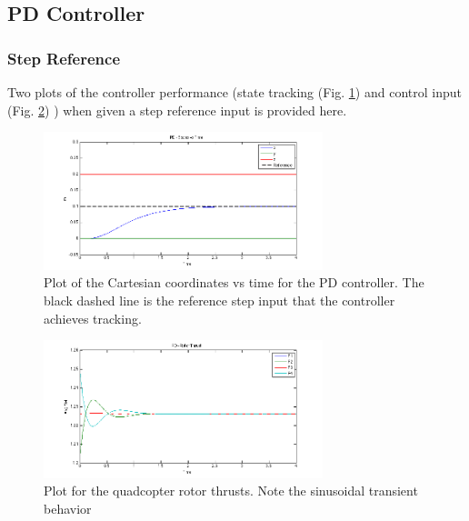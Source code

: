 \documentclass[conference]{IEEEtran}
\begin{document}
\subsection{PD Controller}
\subsubsection{Step Reference}
Two plots of the controller performance (state tracking (Fig. \ref{fig:pd_1}) and control input (Fig. \ref{fig:pd_2}) ) when given a step reference input is provided here.
\begin{figure}[!ht]
\centering
\includegraphics[width=3.2in]{../pd_1.png}
\caption{Plot of the Cartesian coordinates vs time for the PD controller. The black dashed line is the reference step input that the controller achieves tracking.}
\label{fig:pd_1}
\end{figure}
\begin{figure}[!ht]
\centering
\includegraphics[width=3.2in]{../pd_2.png}
\caption{Plot for the quadcopter rotor thrusts. Note the sinusoidal transient behavior}
\label{fig:pd_2}
\end{figure}
\end{document}

